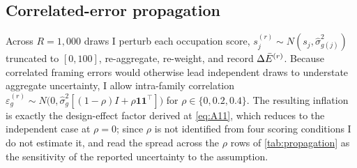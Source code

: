 \subsection{Correlated-error propagation}

Across $R = 1{,}000$ draws I perturb each occupation score, $s^{(r)}_j \sim N(s_j, \widehat{\sigma}^2_{g(j)})$ truncated to $[0,100]$, re-aggregate, re-weight, and record $\Delta\bar{E}^{(r)}$. Because correlated framing errors would otherwise lead independent draws to understate aggregate uncertainty, I allow intra-family correlation $\varepsilon^{(r)}_g \sim N\bigl(0, \widehat{\sigma}^2_g [(1-\rho)I + \rho \bm{1}\bm{1}^{\top}]\bigr)$ for $\rho \in \{0, 0.2, 0.4\}$. The resulting inflation is exactly the design-effect factor derived at \cref{eq:A11}, which reduces to the independent case at $\rho = 0$; since $\rho$ is not identified from four scoring conditions I do not estimate it, and read the spread across the $\rho$ rows of \cref{tab:propagation} as the sensitivity of the reported uncertainty to the assumption.



